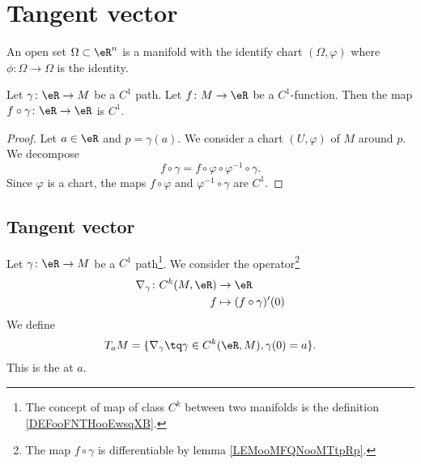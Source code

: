 \section{Tangent vector}

\begin{definition}
	An open set \( \Omega\subset \eR^n\) is a manifold with the identify chart \( (\Omega, \varphi)\) where \( \phi\colon \Omega\to \Omega\) is the identity.
\end{definition}

\begin{lemma}		\label{LEMooMFQNooMTtpRp}
	Let \( \gamma\colon \eR\to M\) be a \( C^1\) path. Let \( f\colon M\to \eR\) be a \( C^1\)-function. Then the map \( f\circ \gamma\colon \eR\to \eR\) is \( C^1\).
\end{lemma}

\begin{proof}
	Let \( a\in \eR\) and \( p=\gamma(a)\). We consider a chart \( (U,\varphi)\) of \( M\) around \( p\). We decompose
	\begin{equation}
		f\circ \gamma= f\circ \varphi\circ \varphi^{-1}\circ\gamma.
	\end{equation}
	Since \( \varphi\) is a chart, the maps \( f\circ\varphi\) and \( \varphi^{-1}\circ\gamma\) are \( C^1\).
\end{proof}


\subsection{Tangent vector}

\begin{definition}      \label{DEFooJJVIooDUBwDJ}
	Let \( \gamma\colon \eR\to M\) be a \( C^1\) path\footnote{The concept of map of class \( C^k\) between two manifolds is the definition \ref{DEFooFNTHooEwsqXB}.}. We consider the operator\footnote{The map \( f\circ\gamma\) is differentiable by lemma \ref{LEMooMFQNooMTtpRp}.}
	\begin{equation}
		\begin{aligned}
			\nabla_{\gamma}\colon C^k(M,\eR) & \to \eR                     \\
			f                                & \mapsto (f\circ \gamma)'(0)
		\end{aligned}
	\end{equation}
	We define
	\begin{equation}
		T_aM=\{ \nabla_{\gamma}\tq \gamma\in C^k(\eR,M),\gamma(0)=a \}.
	\end{equation}
	This is the  at \( a\).
\end{definition}

